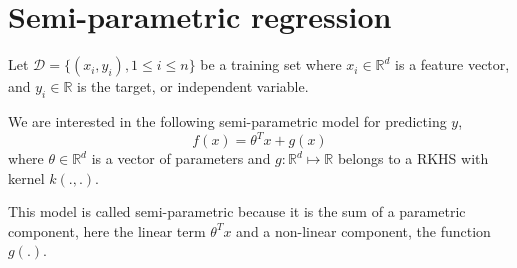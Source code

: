 \documentclass[11pt]{article}
\begin{document}
\section{Semi-parametric regression}
Let $\mathcal{D}=\{(x_i,y_i), 1 \leq i \leq n\}$ be a training set where $x_i \in \mathbb{R}^d$ is a feature vector, and $y_i \in \mathbb{R}$ is the target, or independent variable. 

We are interested in the following semi-parametric model for predicting $y$, 
\begin{equation}
f(x) = \theta^T x + g(x)
\end{equation}
where $\theta \in \mathbb{R}^d$ is a vector of parameters and $g: \mathbb{R}^d \mapsto \mathbb{R}$ belongs to a RKHS with kernel $k(.,.)$. 

This model is called semi-parametric because it is the sum of a parametric component, here the linear term $\theta^T x$ and a non-linear component, the function $g(.)$. 
\end{document}
